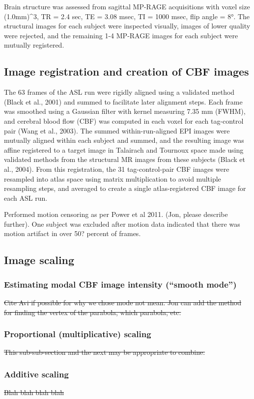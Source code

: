 Brain structure was assessed from sagittal MP-RAGE acquisitions with voxel size (1.0mm)^3, TR = 2.4 sec, TE = 3.08 msec, TI = 1000 msec, flip angle = 8°. The structural images for each subject were inspected visually, images of lower quality were rejected, and the remaining 1-4 MP-RAGE images for each subject were mutually registered.


\subsection{Image registration and creation of CBF images}
The 63 frames of the ASL run were rigidly aligned using a validated method (Black et al., 2001) and summed to facilitate later alignment steps. Each frame was smoothed using a Gaussian filter with kernel measuring 7.35 mm (FWHM), and cerebral blood flow (CBF) was computed in each voxel for each tag-control pair (Wang et al., 2003). The summed within-run-aligned EPI images were mutually aligned within each subject and summed, and the resulting image was affine registered to a target image in Talairach and Tournoux space made using validated methods from the structural MR images from these subjects (Black et al., 2004). From this registration, the 31 tag-control-pair CBF images were resampled into atlas space using matrix multiplication to avoid multiple resampling steps, and averaged to create a single atlas-registered CBF image for each ASL run. 


Performed motion censoring as per Power et al 2011. (Jon, please describe further). One subject was excluded after motion data indicated that there was motion artifact in over 50? percent of frames.

\subsection{Image scaling}
\subsubsection{Estimating modal CBF image intensity (``smooth mode'')}
\sout{Cite Avi if possible for why we chose mode not mean. Jon can add the method for finding the vertex of the parabola, which parabola, etc.} 
\subsubsection{Proportional (multiplicative) scaling}
\sout{This sub-sub-section and the next may be appropriate to combine.}
\subsubsection{Additive scaling}
\sout{Blah blah blah blah}

